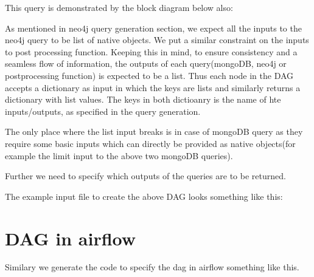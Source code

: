 \documentclass[letterpaper,10pt,english]{sphinxmanual}
\begin{document}
This query is demonstrated by the block diagram below also:

\noindent{}

As mentioned in neo4j query generation section, we expect all the inputs to the neo4j query to be  list of native objects. We put a similar constraint on the inputs to post processing function. Keeping this in mind, to ensure consistency and a seamless flow of information, the outputs of each query(mongoDB, neo4j or postprocessing function) is expected to be a list. Thus each node in the DAG accepts a dictionary as input in which the keys are lists and similarly returns a dictionary with list values. The keys in both dictioanry is the name of hte inputs/outputs, as specified in the query generation.

The only place where the list input breaks is in case of mongoDB query as they require some basic inputs which can directly be provided as native objects(for example the limit input to the above two mongoDB queries).

Further we need to specify which outputs of the queries are to be returned.

The example input file to create the above DAG looks something like this:

%
\begin{sphinxVerbatim}[commandchars=\\\{\}]
 
 
 
 
 
\end{sphinxVerbatim}


\section{DAG in airflow}
\label{\detokenize{dag:dag-in-airflow}}
Similary we generate the code to specify the dag in airflow something like this.
\end{document}
